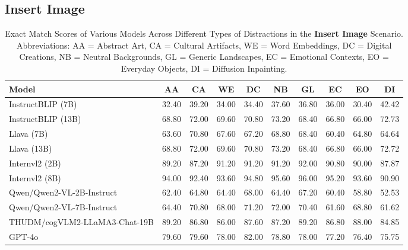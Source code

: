 \subsection{Insert Image}

\begin{table*}[H]
  \centering
  \caption{Exact Match Scores of Various Models Across Different Types of Distractions in the \textbf{Insert Image} Scenario. Abbreviations: AA = Abstract Art, CA = Cultural Artifacts, WE = Word Embeddings, DC = Digital Creations, NB = Neutral Backgrounds, GL = Generic Landscapes, EC = Emotional Contexts, EO = Everyday Objects, DI = Diffusion Inpainting.}
  \label{tab:performance_metrics_details_insert_image}
  \begin{tabular}{l *{9}{S[table-format=2.2]}}
    \toprule
    \textbf{Model} & \textbf{AA} & \textbf{CA} & \textbf{WE} & \textbf{DC} & \textbf{NB} & \textbf{GL} & \textbf{EC} & \textbf{EO} & \textbf{DI} \\
    \midrule
    InstructBLIP (7B)             & 32.40 & 39.20 & 34.00 & 34.40 & 37.60 & 36.80 & 36.00 & 30.40 & 42.42 \\
    InstructBLIP (13B)            & 68.80 & 72.00 & 69.60 & 70.80 & 73.20 & 68.40 & 66.80 & 66.00 & 72.73 \\
    Llava (7B)                    & 63.60 & 70.80 & 67.60 & 67.20 & 68.80 & 68.40 & 60.40 & 64.80 & 64.64 \\
    Llava (13B)                   & 68.80 & 72.00 & 69.60 & 70.80 & 73.20 & 68.40 & 66.80 & 66.00 & 72.72 \\
    Internvl2 (2B)                & 89.20 & 87.20 & 91.20 & 91.20 & 91.20 & 92.00 & 90.80 & 90.00 & 87.87 \\
    Internvl2 (8B)                & 94.00 & 92.40 & 93.60 & 94.80 & 95.60 & 96.00 & 95.20 & 93.60 & 90.90 \\
    Qwen/Qwen2-VL-2B-Instruct      & 62.40 & 64.80 & 64.40 & 68.00 & 64.40 & 67.20 & 60.40 & 58.80 & 52.53 \\
    Qwen/Qwen2-VL-7B-Instruct      & 64.40 & 70.80 & 68.00 & 71.20 & 72.00 & 70.40 & 61.60 & 68.80 & 61.62 \\
    THUDM/cogVLM2-LLaMA3-Chat-19B & 89.20 & 86.80 & 86.00 & 87.60 & 87.20 & 89.20 & 86.80 & 88.00 & 84.85 \\
     GPT-4o                       & 79.60 & 79.60 & 78.00 & 82.00 & 78.80 & 78.00 & 77.20 & 76.40 & 75.75 \\
    \bottomrule
  \end{tabular}
\end{table*}




